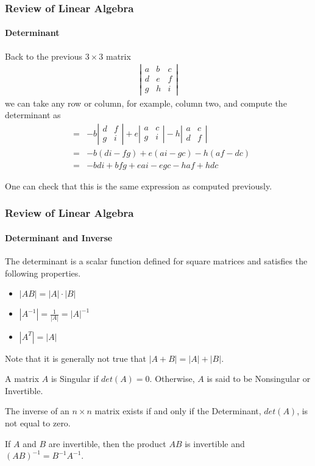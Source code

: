 \begin{frame}
\frametitle{Review of Linear Algebra}
\framesubtitle{Determinant}
\begin{examp}
Back to the previous $3\times 3$ matrix
\begin{eqnarray*}
\left|\begin{array}{ccc}
a & b & c \\
d & e & f \\
g & h & i
\end{array}\right|
\end{eqnarray*}
we can take any row or column, for example, column two, and compute the determinant as
\begin{eqnarray*}
&=& -b \left| \begin{array}{cc} d & f \\ g & i \end{array}\right|
+e \left| \begin{array}{cc} a & c \\ g & i \end{array}\right|
-h \left| \begin{array}{cc} a & c \\ d & f \end{array}\right| \\
&=& -b(di-fg)+e(ai-gc) -h(af-dc)\\
&=& -bdi +bfg +eai -egc -haf +hdc
\end{eqnarray*}
\end{examp}
One can check that this is the same expression as computed previously.
\end{frame}
\begin{frame}
\frametitle{Review of Linear Algebra}
\framesubtitle{Determinant and Inverse}
The determinant is a scalar function defined for square matrices and satisfies
the following properties.
\begin{itemize}
\item $|AB| = |A|\cdot|B|$
\item $|A^{-1}| = {\frac{1}{|A|}} = |A|^{-1}$
\item $|A^T| = |A|$
\end{itemize}
Note that it is generally {\bor not true} that $|A+B| = |A| + |B|$.
\begin{definition}
A matrix $A$ is {\bor Singular} if $det(A)=0$.  Otherwise, $A$ is said to be
{\bor Nonsingular} or {\bor Invertible}.
\end{definition}
\begin{theorem}
The inverse of an $n\times n$ matrix exists if and only if the {\bor Determinant}, $det(A)$,
is not equal to zero.

If $A$ and $B$ are invertible, then the product $AB$ is invertible and $(AB)^{-1} = B^{-1}A^{-1}$.
\end{theorem}
\end{frame}
